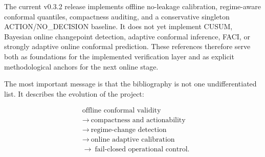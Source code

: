 The current v0.3.2 release implements offline no-leakage calibration, regime-aware conformal quantiles, compactness auditing, and a conservative singleton ACTION/NO\_DECISION baseline. It does not yet implement CUSUM, Bayesian online changepoint detection, adaptive conformal inference, FACI, or strongly adaptive online conformal prediction. These references therefore serve both as foundations for the implemented verification layer and as explicit methodological anchors for the next online stage.

The most important message is that the bibliography is not one undifferentiated list. It describes the evolution of the project:

\[
\begin{aligned}
&\text{offline conformal validity}\\
&\rightarrow\ \text{compactness and actionability}\\
&\rightarrow\ \text{regime-change detection}\\
&\rightarrow\ \text{online adaptive calibration}\\
&\rightarrow\ \text{fail-closed operational control}.
\end{aligned}
\]
